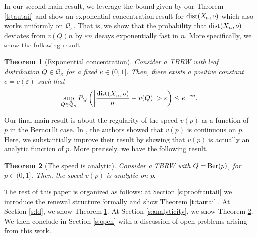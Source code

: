 \documentclass[a4paper]{amsart}
\newtheorem{theorem}{Theorem}
\newcommand{\D}[1]{{\rm dist}(X_{#1},o)}
\begin{document}
In our second main result, we leverage the bound given by our Theorem \ref{t:tautail} and show an exponential concentration result for $\D{n}$ which also works uniformly on $\mathcal{Q}_\kappa$. That is, we show that the probability that $\D{n}$ deviates from $v(Q)n$ by $\varepsilon n$ decays exponentially fast in $n$. More specifically, we show the following result.
\begin{theorem}[Exponential concentration]\label{t:ld} Consider a TBRW with leaf distribution $Q \in \mathcal{Q}_{\kappa}$ for a fixed $\kappa \in (0,1]$. Then, there exists a positive constant $c=c(\varepsilon)$ such that
$$
\sup_{Q \in \mathcal{Q}_\kappa}P_Q\left(\left| \frac{\D{n}}{n} - v(Q)\right|>\varepsilon \right) \le e^{-cn}.
$$    
\end{theorem}
Our final main result is about the regularity of the speed $v(p)$ as a function of $p$ in the Bernoulli case. In \cite{ribeiro2023}, the authors showed that $v(p)$ is continuous on $p$. Here, we substantially improve their result by showing that $v(p)$ is actually an analytic function of $p$. More precisely, we have the following result.
\begin{theorem}[The speed is analytic]\label{t:v}
Consider a TBRW with $Q = {\rm Ber}(p)$, for $p \in (0,1]$. Then, the speed $v(p)$ is analytic on $p$.    
\end{theorem}
The rest of this paper is organized as follows: at Section \ref{s:prooftautail} we introduce the renewal structure formally and show Theorem \ref{t:tautail}. At Section \ref{s:ld}, we show Theorem \ref{t:ld}. At Section \ref{s:analyticity}, we show Theorem \ref{t:v}. We then conclude in Section \ref{s:open} with a discussion of open problems arising from this work.





\end{document}
